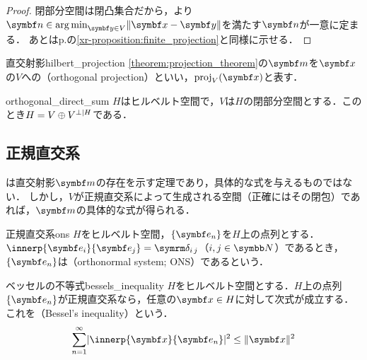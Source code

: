 \documentclass[../../main]{subfiles}
\begin{document}
\begin{proof}
  閉部分空間は閉凸集合だから，より\(\vect{n}\in\argmin_{\vect{y}\in V}\vnorm{\vect{x}-\vect{y}}\)を満たす\(\vect{n}\)が一意に定まる．
  あとはp.\pageref{xr-proposition:finite_projection}の\cref{xr-proposition:finite_projection}と同様に示せる．
\end{proof}

\begin{definition}{直交射影}{hilbert_projection}
  \cref{theorem:projection_theorem}の\(\vect{m}\)を\(\vect{x}\)の\(V\)への（orthogonal projection）といい，\(\proj_V(\vect{x})\)と表す．
\end{definition}

\begin{proposition}{}{orthogonal_direct_sum}
  \(H\)はヒルベルト空間で，\(V\)は\(H\)の閉部分空間とする．このとき\(H=V\oplus\pcomp[H]{V}\)である．
\end{proposition}

\subsection{正規直交系}

は直交射影\(\vect{m}\)の存在を示す定理であり，具体的な式を与えるものではない．
しかし，\(V\)が正規直交系によって生成される空間（正確にはその閉包）であれば，\(\vect{m}\)の具体的な式が得られる．

\begin{definition}{正規直交系}{ons}
  \(H\)をヒルベルト空間，\(\seq{\vect{e}_n}\)を\(H\)上の点列とする．\(\innerp{\vect{e}_i}{\vect{e}_j}=\kdelta{i}{j}\)（\(i,j\in\numset{N}\)）であるとき，\(\seq{\vect{e}_n}\)は（orthonormal system; ONS）であるという．
\end{definition}

\begin{theorem}{ベッセルの不等式}{bessels_inequality}
  \(H\)をヒルベルト空間とする．\(H\)上の点列\(\seq{\vect{e}_n}\)が正規直交系なら，任意の\(\vect{x}\in H\)に対して次式が成立する．
  これを（Bessel's inequality）という．
  \begin{equation}
    \label{equation:bessels_inequality}
    \sum_{n=1}^\infty\abs{\innerp{\vect{x}}{\vect{e}_n}}^2 \leq \vnorm{\vect{x}}^2
  \end{equation}
\end{theorem}
\end{document}
